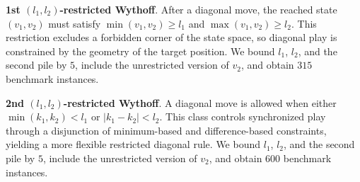 \documentclass[review]{elsarticle}
\newcommand{\set}[1]{\{ #1 \}}
\newcommand{\tuple}[1]{\langle {#1} \rangle}
\newcommand{\true}{\top}
\newcommand{\statevar}{\mathcal{X}}
\newcommand{\act}{\mathcal{A}}
\newcommand{\constraint}{\mathcal{C}}
\newcommand{\estate}{\mathcal{E}}
\newcommand{\pre}{\mathtt{pre}}
\newcommand{\eff}{\mathtt{eff}}
\begin{document}
{\color{red}\textbf{1st $(l_1, l_2)$-restricted Wythoff}. After a diagonal move, the reached state $(v_1,v_2)$ must satisfy $\min(v_1,v_2) \ge l_1$ and $\max(v_1,v_2) \ge l_2$.}
{\color{red}This restriction excludes a forbidden corner of the state space, so diagonal play is constrained by the geometry of the target position.}
{\color{red}We bound $l_1$, $l_2$, and the second pile by $5$, include the unrestricted version of $v_2$, and obtain $315$ benchmark instances.}

{\color{red}\textbf{2nd $(l_1,l_2)$-restricted Wythoff}. A diagonal move is allowed when either $\min(k_1,k_2) < l_1$ or $|k_1-k_2| < l_2$.}
{\color{red}This class controls synchronized play through a disjunction of minimum-based and difference-based constraints, yielding a more flexible restricted diagonal rule.}
{\color{red}We bound $l_1$, $l_2$, and the second pile by $5$, include the unrestricted version of $v_2$, and obtain $600$ benchmark instances.}
\end{document}
